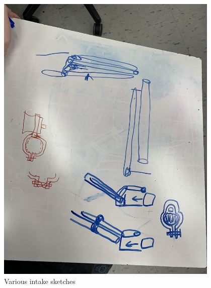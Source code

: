 \begin{figure}[ht]
\centering
\begin{minipage}[b]{.48\textwidth}
  \centering
  \includegraphics[width=0.95\textwidth]{Meetings/November/11-17-21/11-17-21_Hardware_Figure1 - Nathan Forrer.JPG}
  \caption{Various intake sketches}
  \label{fig:pic1}
\end{minipage}%
\hfill%
\begin{minipage}[b]{.48\textwidth}
  \centering

\end{minipage}
\end{figure}
